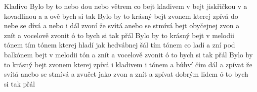 \begin{TEXT}{Kladivo}
\SLOKA Bylo by to    nebo  \NL
{} dou nebo   větrem co  \NL
bejt kladivem v  bejt jiskřičkou v  \NL
a kovadlinou  a  a ově  \NL
{}   bych      si tak         
\SLOKA Bylo by to krásný bejt zvonem kterej zpívá \NL
do nebe se dívá a nebo i dál \NL
zvoní že svítá anebo se stmívá \NL
bejt obyčejnej zvon a znít a vocelově zvonit \NL
ó to bych si tak přál 
\SLOKA Bylo by to krásný bejt v melodii tónem \NL
tím tónem kterej hladí jak hedvábnej šál \NL
tím tónem co ladí a zní pod balkónem \NL
bejt v melodii tón a znít a vocelově zvonit \NL
ó to bych si tak přál 
\SLOKA Bylo by to krásný bejt zvonem kterej zpívá \NL
i kladivem i tónem a bůhví čím dál \NL
a zpívat že svítá anebo se stmívá \NL
a zvučet jako zvon a znít a zpívat dobrým lidem \NL
ó to bych si tak přál \NL
\end{TEXT}
